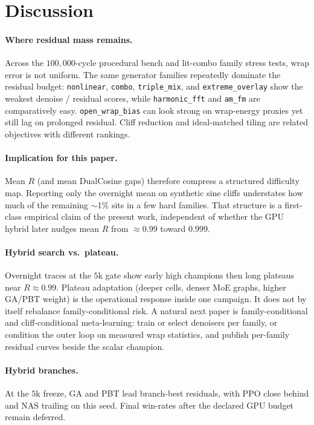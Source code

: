 \section{Discussion}
\label{sec:discussion}

\paragraph{Where residual mass remains.}
Across the $100{,}000$-cycle procedural bench and lit-combo family stress tests, wrap error is not uniform.
The same generator families repeatedly dominate the residual budget: \texttt{nonlinear}, \texttt{combo}, \texttt{triple\_mix}, and \texttt{extreme\_overlay} show the weakest denoise / residual scores, while \texttt{harmonic\_fft} and \texttt{am\_fm} are comparatively easy.
\texttt{open\_wrap\_bias} can look strong on wrap-energy proxies yet still lag on prolonged residual. Cliff reduction and ideal-matched tiling are related objectives with different rankings.

\paragraph{Implication for this paper.}
Mean $R$ (and mean DualCosine gaps) therefore compress a structured difficulty map.
Reporting only the overnight mean on synthetic sine cliffs understates how much of the remaining $\sim$1\% sits in a few hard families.
That structure is a first-class empirical claim of the present work, independent of whether the GPU hybrid later nudges mean $R$ from $\approx 0.99$ toward $0.999$.

\paragraph{Hybrid search vs.\ plateau.}
Overnight traces at the $5$k gate show early high champions then long plateaus near $R\approx 0.99$.
Plateau adaptation (deeper cells, denser MoE graphs, higher GA/PBT weight) is the operational response inside one campaign. It does not by itself rebalance family-conditional risk.
A natural next paper is family-conditional and cliff-conditional meta-learning: train or select denoisers per family, or condition the outer loop on measured wrap statistics, and publish per-family residual curves beside the scalar champion.

\paragraph{Hybrid branches.}
At the $5$k freeze, GA and PBT lead branch-best residuals, with PPO close behind and NAS trailing on this seed.
Final win-rates after the declared GPU budget remain deferred.
